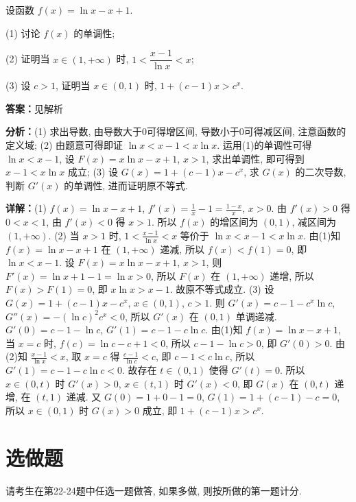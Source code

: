 \begin{question}[points=12]
设函数 $f(x)=\ln x-x+1$.

(1) 讨论 $f(x)$ 的单调性;

(2) 证明当 $x\in(1,+\infty)$ 时, $1<\dfrac{x-1}{\ln x}<x$;

(3) 设 $c>1$, 证明当 $x\in(0,1)$ 时, $1+(c-1)x>c^x$.
\begin{solution}
\textbf{答案：}见解析

\textbf{分析：}(1) 求出导数, 由导数大于0可得增区间, 导数小于0可得减区间, 注意函数的定义域;
(2) 由题意可得即证 $\ln x<x-1<x\ln x$. 运用(1)的单调性可得 $\ln x<x-1$, 设 $F(x)=x\ln x-x+1$, $x>1$, 求出单调性, 即可得到 $x-1<x\ln x$ 成立;
(3) 设 $G(x)=1+(c-1)x-c^x$, 求 $G(x)$ 的二次导数, 判断 $G'(x)$ 的单调性, 进而证明原不等式.

\textbf{详解：}(1) $f(x)=\ln x-x+1$, $f'(x)=\frac{1}{x}-1=\frac{1-x}{x}$, $x>0$. 由 $f'(x)>0$ 得 $0<x<1$, 由 $f'(x)<0$ 得 $x>1$. 所以 $f(x)$ 的增区间为 $(0,1)$, 减区间为 $(1,+\infty)$.
(2) 当 $x>1$ 时, $1<\frac{x-1}{\ln x}<x$ 等价于 $\ln x<x-1<x\ln x$. 由(1)知 $f(x)=\ln x-x+1$ 在 $(1,+\infty)$ 递减, 所以 $f(x)<f(1)=0$, 即 $\ln x<x-1$. 设 $F(x)=x\ln x-x+1$, $x>1$, 则 $F'(x)=\ln x+1-1=\ln x>0$, 所以 $F(x)$ 在 $(1,+\infty)$ 递增, 所以 $F(x)>F(1)=0$, 即 $x\ln x>x-1$. 故原不等式成立.
(3) 设 $G(x)=1+(c-1)x-c^x$, $x\in(0,1)$, $c>1$. 则 $G'(x)=c-1-c^x\ln c$, $G''(x)=-(\ln c)^2 c^x<0$, 所以 $G'(x)$ 在 $(0,1)$ 单调递减. $G'(0)=c-1-\ln c$, $G'(1)=c-1-c\ln c$. 由(1)知 $f(x)=\ln x-x+1$, 当 $x=c$ 时, $f(c)=\ln c-c+1<0$, 所以 $c-1-\ln c>0$, 即 $G'(0)>0$. 由(2)知 $\frac{x-1}{\ln x}<x$, 取 $x=c$ 得 $\frac{c-1}{\ln c}<c$, 即 $c-1<c\ln c$, 所以 $G'(1)=c-1-c\ln c<0$. 故存在 $t\in(0,1)$ 使得 $G'(t)=0$. 所以 $x\in(0,t)$ 时 $G'(x)>0$, $x\in(t,1)$ 时 $G'(x)<0$, 即 $G(x)$ 在 $(0,t)$ 递增, 在 $(t,1)$ 递减. 又 $G(0)=1+0-1=0$, $G(1)=1+(c-1)-c=0$, 所以 $x\in(0,1)$ 时 $G(x)>0$ 成立, 即 $1+(c-1)x>c^x$.
\end{solution}
\end{question}

\section*{选做题}
请考生在第22-24题中任选一题做答, 如果多做, 则按所做的第一题计分.

